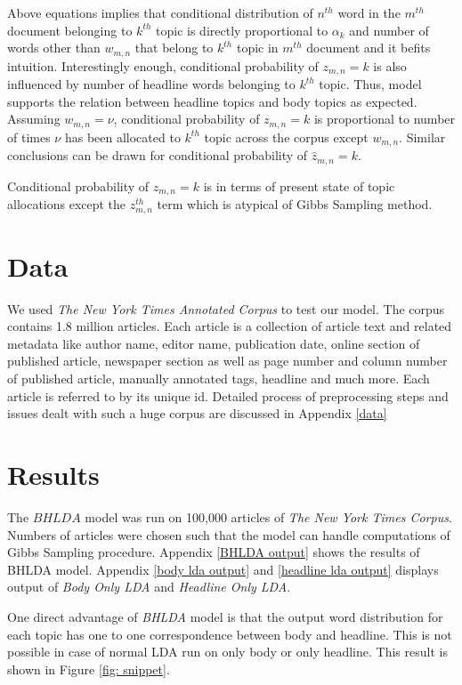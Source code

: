 \documentclass[a4paper]{article}
\begin{document}
Above equations implies that conditional distribution of $n^{th}$ word in the $m^{th}$ document belonging to $k^{th}$ topic is directly proportional to $\alpha_{k}$ and number of words other than $w_{m,n}$ that belong to $k^{th}$ topic in $m^{th}$ document and it befits intuition. Interestingly enough, conditional probability of $z_{m,n}=k$ is also influenced by number of headline words belonging to $k^{th}$ topic. Thus, model supports the relation between headline topics and body topics as expected. Assuming $w_{m,n} = \nu$, conditional probability of $z_{m,n}=k$ is proportional to number of times $\nu$ has been allocated to $k^{th}$ topic across the corpus except $w_{m,n}$. Similar conclusions can be drawn for conditional probability of  $\hat{z}_{m,n} = k$. 

Conditional probability of $z_{m,n} = k$ is in terms of present state of topic allocations except the $z_{m,n}^{th}$ term which is atypical of Gibbs Sampling method. 


\section{Data}
We used \textit{The New York Times Annotated Corpus} \cite{corpus} to test our model. The corpus contains 1.8 million articles. Each article is a collection of article text and related metadata like author name, editor name, publication date, online section of published article, newspaper section as well as page number and column number of published article, manually annotated tags, headline and much more. Each article is referred to by its unique id. Detailed process of preprocessing steps and issues dealt with such a huge corpus are discussed in Appendix \ref{data}

\section{Results}
The $BHLDA$ model was run on 100,000 articles of \emph{The New York Times Corpus}. Numbers of articles were chosen such that the model can handle computations of Gibbs Sampling procedure. Appendix \ref{BHLDA output} shows the results of BHLDA model. Appendix \ref{body lda output} and \ref{headline lda output} displays output of \emph{Body Only LDA} and \emph{Headline Only LDA}. 

One direct advantage of \emph{BHLDA} model is that the output word distribution for each topic has one to one correspondence between body and headline. This is not possible in case of normal LDA run on only body or only headline. This result is shown in Figure \ref{fig: snippet}. 
\end{document}
